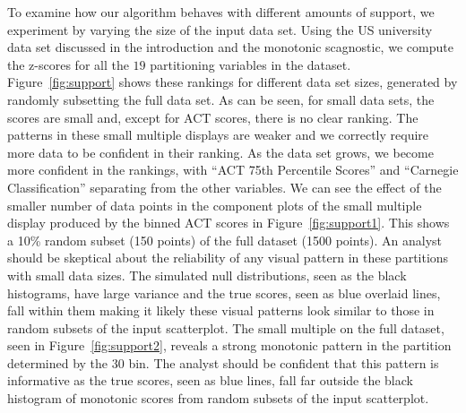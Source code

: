 To examine how our algorithm behaves with different amounts of support, we experiment by varying the size of the input data set. Using the US university data set discussed in the introduction and the monotonic scagnostic, we compute the z-scores for all the $19$ partitioning variables in the dataset. Figure~\ref{fig:support} shows these rankings for different data set sizes, generated by randomly subsetting the full data set.
As can be seen, for small data sets, the scores are small and, except for ACT scores, there is no clear ranking. The patterns in these small multiple displays are weaker and we correctly require more data to be confident in their ranking. As the data set grows, we become more confident in the rankings, with ``ACT 75th Percentile Scores'' and ``Carnegie Classification'' separating from the other variables. 
We can see the effect of the smaller number of data points in the component plots of the small multiple display produced by the binned ACT scores in Figure~\ref{fig:support1}. This shows a 10\% random subset (150 points) of the full dataset (1500 points). An analyst should be skeptical about the reliability of any visual pattern in these partitions with small data sizes. The simulated null distributions, seen as the black histograms, have large variance and the true scores, seen as blue overlaid lines, fall within them making it likely these visual patterns look similar to those in random subsets of the input scatterplot.
The small multiple on the full dataset, seen in Figure~\ref{fig:support2}, reveals a strong monotonic pattern in the partition determined by the $30$ bin. The analyst should be confident that this pattern is informative as the true scores, seen as blue lines, fall far outside the black histogram of monotonic scores from random subsets of the input scatterplot.

